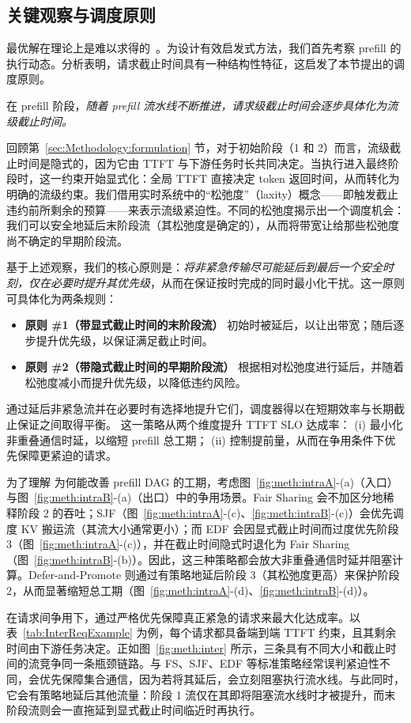\subsection{关键观察与调度原则}


最优解在理论上是难以求得的~\cite{bettati1990algorithms,bettati1992end}。为设计有效启发式方法，我们首先考察 prefill 的执行动态。分析表明，请求截止时间具有一种结构性特征，这启发了本节提出的调度原则。

在 prefill 阶段，\emph{随着 prefill 流水线不断推进，请求级截止时间会逐步具体化为流级截止时间。}

回顾第~\ref{sec:Methodology:formulation} 节，对于初始阶段（1 和 2）而言，流级截止时间是隐式的，因为它由 TTFT 与下游任务时长共同决定。当执行进入最终阶段时，这一约束开始显式化：全局 TTFT 直接决定 token 返回时间，从而转化为明确的流级约束。我们借用实时系统中的“松弛度”（laxity）概念——即触发截止违约前所剩余的预算——来表示流级紧迫性。不同的松弛度揭示出一个调度机会：我们可以安全地延后末阶段流（其松弛度是确定的），从而将带宽让给那些松弛度尚不确定的早期阶段流。

 基于上述观察，我们的核心原则是：\emph{将非紧急传输尽可能延后到最后一个安全时刻，仅在必要时提升其优先级}，从而在保证按时完成的同时最小化干扰。这一原则可具体化为两条规则：
\begin{itemize}[leftmargin=*]
    \item \textbf{原则 \#1（带显式截止时间的末阶段流）} 初始时被延后，以让出带宽；随后逐步提升优先级，以保证满足截止时间。
    \item \textbf{原则 \#2（带隐式截止时间的早期阶段流）} 根据相对松弛度进行延后，并随着松弛度减小而提升优先级，以降低违约风险。
\end{itemize}

通过延后非紧急流并在必要时有选择地提升它们，调度器得以在短期效率与长期截止保证之间取得平衡。
这一策略从两个维度提升 TTFT SLO 达成率：
(i) 最小化非重叠通信时延，以缩短 prefill 总工期；
(ii) 控制提前量，从而在争用条件下优先保障更紧迫的请求。

为了理解 \DAP 为何能改善 prefill DAG 的工期，考虑图~\ref{fig:meth:intraA}-(a)（入口）与图~\ref{fig:meth:intraB}-(a)（出口）中的争用场景。Fair Sharing 会不加区分地稀释阶段 2 的吞吐；SJF（图~\ref{fig:meth:intraA}-(c)、\ref{fig:meth:intraB}-(c)）会优先调度 KV 搬运流（其流大小通常更小）；而 EDF 会因显式截止时间而过度优先阶段 3（图~\ref{fig:meth:intraA}-(c)），并在截止时间隐式时退化为 Fair Sharing（图~\ref{fig:meth:intraB}-(b)）。因此，这三种策略都会放大非重叠通信时延并阻塞计算。Defer-and-Promote 则通过有策略地延后阶段 3（其松弛度更高）来保护阶段 2，从而显著缩短总工期（图~\ref{fig:meth:intraA}-(d)、\ref{fig:meth:intraB}-(d)）。

在请求间争用下，\DAP 通过严格优先保障真正紧急的请求来最大化达成率。以表~\ref{tab:InterReqExample} 为例，每个请求都具备端到端 TTFT 约束，且其剩余时间由下游任务决定。正如图~\ref{fig:meth:inter} 所示，三条具有不同大小和截止时间的流竞争同一条瓶颈链路。与 FS、SJF、EDF 等标准策略经常误判紧迫性不同，\DAP 会优先保障集合通信，因为若将其延后，会立刻阻塞执行流水线。与此同时，它会有策略地延后其他流量：阶段 1 流仅在其即将阻塞流水线时才被提升，而末阶段流则会一直拖延到显式截止时间临近时再执行。
